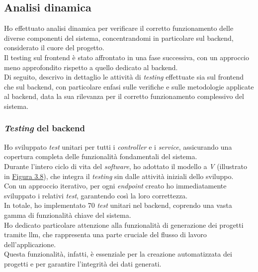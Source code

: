 \subsection{Analisi dinamica}
\label{subsec:analisi-dinamica}


Ho effettuato analisi dinamica per verificare il corretto funzionamento delle diverse componenti del sistema, concentrandomi in particolare sul \gls{backend}, considerato il cuore del progetto. \\
Il testing sul \gls{frontend} è stato affrontato in una fase successiva, con un approccio meno approfondito rispetto a quello dedicato al \gls{backend}.\\

\noindent Di seguito, descrivo in dettaglio le attività di \textit{testing} effettuate sia sul \gls{frontend} che sul \gls{backend}, con particolare enfasi sulle verifiche e sulle metodologie applicate al \gls{backend}, data la sua rilevanza per il corretto funzionamento complessivo del sistema.
\pagebreak
\subsubsection{\textit{Testing} del \gls{backend}}

Ho sviluppato \textit{test} unitari per tutti i \textit{controller} e i \textit{service}, assicurando una copertura completa delle funzionalità fondamentali del sistema.\\

\noindent Durante l'intero ciclo di vita del \textit{software}, ho adottato il modello a \textit{V} (illustrato in {\hyperref[fig:v-model]{Figura 3.8}}), che integra il \textit{testing} sin dalle attività iniziali dello sviluppo. \\
Con un approccio iterativo, per ogni \textit{endpoint} creato ho immediatamente sviluppato i relativi \textit{test}, garantendo così la loro correttezza.\\

\noindent In totale, ho implementato 70 \textit{test} unitari nel \gls{backend}, coprendo una vasta gamma di funzionalità chiave del sistema.\\
Ho dedicato particolare attenzione alla funzionalità di generazione dei progetti tramite \gls{llm}, che rappresenta una parte cruciale del flusso di lavoro dell'applicazione.\\
 Questa funzionalità, infatti, è essenziale per la creazione automatizzata dei progetti e per garantire l'integrità dei dati generati.\\


